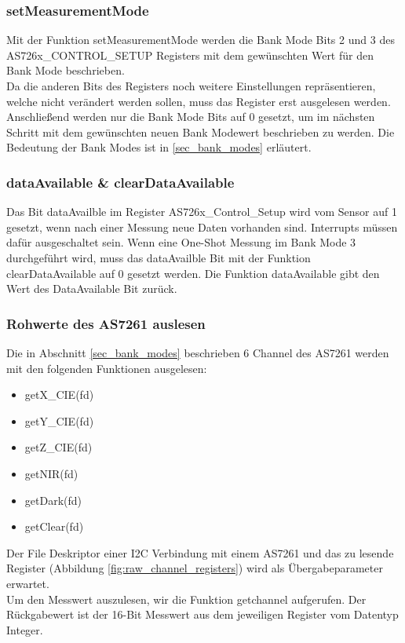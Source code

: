 \subsubsection{setMeasurementMode}
Mit der Funktion setMeasurementMode werden die Bank Mode Bits 2 und 3 des \\
AS726x\_CONTROL\_SETUP Registers mit dem gewünschten Wert für den Bank Mode beschrieben.\\
Da die anderen Bits des Registers noch weitere Einstellungen repräsentieren, welche nicht verändert werden sollen, muss das Register erst ausgelesen werden.
Anschließend werden nur die Bank Mode Bits auf 0 gesetzt, um im nächsten Schritt mit dem gewünschten neuen Bank Modewert beschrieben zu werden. 
Die Bedeutung der Bank Modes ist in \ref{sec_bank_modes} erläutert.

\newpage
\subsubsection{dataAvailable \& clearDataAvailable}
Das Bit dataAvailble im Register AS726x\_Control\_Setup wird vom Sensor auf 1 gesetzt, wenn nach einer Messung neue Daten vorhanden sind. Interrupts müssen dafür ausgeschaltet sein.
Wenn eine One-Shot Messung im Bank Mode 3 durchgeführt wird, muss das dataAvailble Bit mit der Funktion clearDataAvailable auf 0 gesetzt werden. Die Funktion dataAvailable gibt den Wert des DataAvailable Bit zurück.\\

%

\subsubsection{Rohwerte des AS7261 auslesen}
Die in Abschnitt \ref{sec_bank_modes} beschrieben 6 Channel des AS7261 werden mit den folgenden Funktionen ausgelesen:
\begin{itemize}
	\item getX\_CIE(fd)
	\item getY\_CIE(fd)
	\item getZ\_CIE(fd)
	\item getNIR(fd)
	\item getDark(fd) 
	\item getClear(fd)
\end{itemize}
Der File Deskriptor einer I2C Verbindung mit einem AS7261 und das zu lesende Register (Abbildung \ref{fig:raw_channel_registers}) wird als Übergabeparameter erwartet.\\
Um den Messwert auszulesen, wir die Funktion getchannel aufgerufen.
Der Rückgabewert ist der 16-Bit Messwert aus dem jeweiligen Register vom Datentyp Integer.


